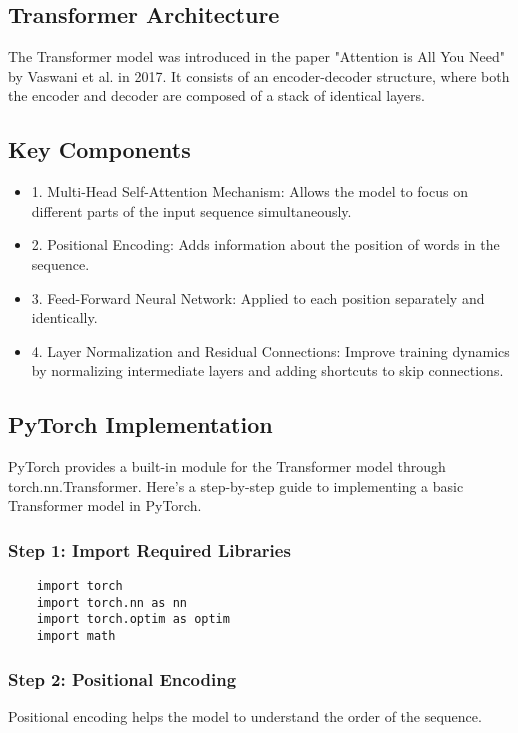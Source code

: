 \documentclass{article}
\begin{document}
\subsection{Transformer Architecture}

The Transformer model was introduced in the paper "Attention is All You 
Need" by Vaswani et al. in 2017. It consists of an encoder-decoder 
structure, where both the encoder and decoder are composed of a stack of 
identical layers.

\subsection{Key Components}

\begin{itemize}
    \item 1. Multi-Head Self-Attention Mechanism: Allows the model to focus on different parts of the input sequence simultaneously.
    \item 2. Positional Encoding: Adds information about the position of words in the sequence.
    \item 3. Feed-Forward Neural Network: Applied to each position separately and identically.
    \item 4. Layer Normalization and Residual Connections: Improve training dynamics by normalizing intermediate layers and adding shortcuts to skip connections.
\end{itemize}

\subsection{PyTorch Implementation}

PyTorch provides a built-in module for the Transformer model through torch.nn.Transformer. Here’s a step-by-step guide to implementing a basic Transformer 
model in PyTorch.

\subsubsection{Step 1: Import Required Libraries}

\begin{lstlisting}
    import torch
    import torch.nn as nn
    import torch.optim as optim
    import math    
\end{lstlisting}
    
\subsubsection*{Step 2: Positional Encoding}
Positional encoding helps the model to understand the order of the sequence.
\end{document}
